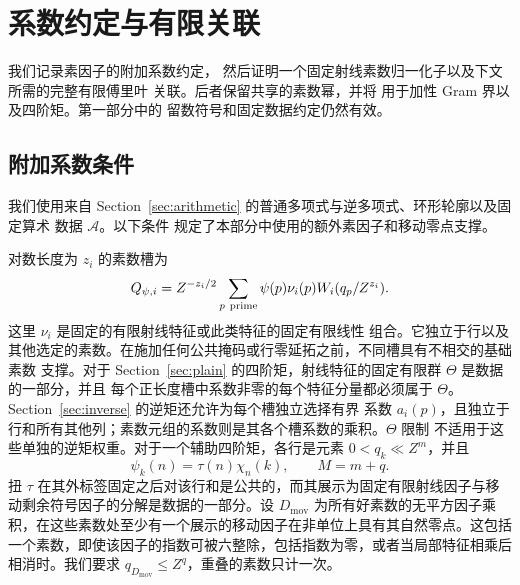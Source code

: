 \documentclass[11pt,a4paper]{article}
\numberwithin{equation}{section}
\numberwithin{figure}{section}
\theoremstyle{definition}
\theoremstyle{remark}
\begin{document}
\section{系数约定与有限关联}
\label{sec:additional-arithmetic}

我们记录素因子的附加系数约定，
然后证明一个固定射线素数归一化子以及下文所需的完整有限傅里叶
关联。后者保留共享的素数幂，并将
用于加性 Gram 界以及四阶矩。第一部分中的
留数符号和固定数据约定仍然有效。

\subsection{附加系数条件}

我们使用来自 Section~\ref{sec:arithmetic} 的普通多项式与逆多项式、环形轮廓以及固定算术
数据 $\mathcal A$。以下条件
规定了本部分中使用的额外素因子和移动零点支撑。

对数长度为 $z_i$ 的素数槽为
\begin{equation}
 Q_{\psi,i}=Z^{-z_i/2}\sum_{p\ {\rm prime}}
       \psi(p)\nu_i(p)W_i(q_p/Z^{z_i}).
 \label{old-eq:1.2}
\end{equation}
这里 $\nu_i$ 是固定的有限射线特征或此类特征的固定有限线性
组合。它独立于行以及
其他选定的素数。在施加任何公共掩码或行零延拓之前，不同槽具有不相交的基础素数
支撑。对于 Section~\ref{sec:plain} 的四阶矩，射线特征的固定有限群 $\Theta$ 是数据的一部分，并且
每个正长度槽中系数非零的每个特征分量都必须属于 $\Theta$。
Section~\ref{sec:inverse} 的逆矩还允许为每个槽独立选择有界
系数 $a_i(p)$，且独立于
行和所有其他列；素数元组的系数则是其各个槽系数的乘积。$\Theta$ 限制
不适用于这些单独的逆矩权重。对于一个辅助四阶矩，各行是元素 $0<q_k\ll Z^m$，并且
\begin{equation}
 \psi_k(n)=\tau(n)\chi_n(k),\qquad M=m+q.
 \label{old-eq:1.3}
\end{equation}
扭 $\tau$ 在其外标签固定之后对该行和是公共的，而其展示为固定有限射线因子与移动剩余符号因子的分解是数据的一部分。设 $D_{\mathrm{mov}}$ 为所有好素数的无平方因子乘积，在这些素数处至少有一个展示的移动因子在非单位上具有其自然零点。这包括一个素数，即使该因子的指数可被六整除，包括指数为零，或者当局部特征相乘后相消时。我们要求
$q_{D_{\mathrm{mov}}}\le Z^q$，重叠的素数只计一次。
\end{document}
